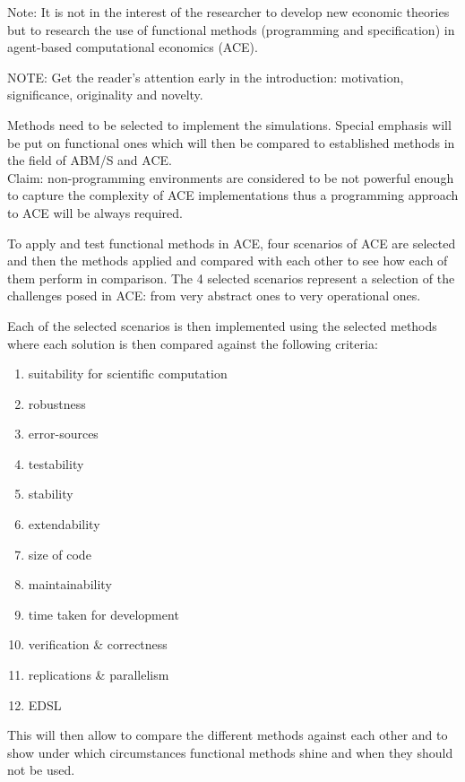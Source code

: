 Note: It is not in the interest of the researcher to develop new economic theories but to research the use of functional methods (programming and specification) in agent-based computational economics (ACE).

NOTE: Get the reader’s attention early in the introduction: motivation, significance, originality and novelty.

Methods need to be selected to implement the simulations. Special emphasis will be put on functional ones which will then be compared to established methods in the field of ABM/S and ACE. \\

Claim: non-programming environments are considered to be not powerful enough to capture the complexity of ACE implementations thus a programming approach to ACE will be always required.


To apply and test functional methods in ACE, four scenarios of ACE are selected and then the methods applied and compared with each other to see how each of them perform in comparison. The 4 selected scenarios represent a selection of the challenges posed in ACE: from very abstract ones to very operational ones.

Each of the selected scenarios is then implemented using the selected methods where each solution is then compared against the following criteria: 

\begin{enumerate}
\item suitability for scientific computation
\item robustness
\item error-sources
\item testability
\item stability
\item extendability
\item size of code
\item maintainability
\item time taken for development
\item verification \& correctness
\item replications \& parallelism
\item EDSL
\end{enumerate}

This will then allow to compare the different methods against each other and to show under which circumstances functional methods shine and when they should not be used.




